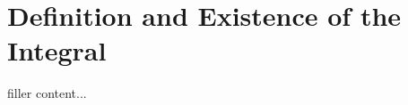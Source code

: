 \documentclass[../../templates/section]{subfiles}
\begin{document}
\section{Definition and Existence of the Integral}\label{sec:definition-and-existence-of-the-integral}

filler content...
\end{document}
